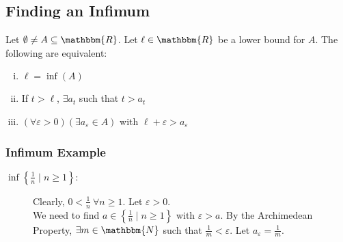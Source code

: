 \documentclass[10pt]{extarticle}
\newcommand{\N}{\mathbbm{N}}
\newcommand{\R}{\mathbbm{R}}
\begin{document}
    \subsection{Finding an Infimum}%
    Let $\emptyset \neq A \subseteq \R$. Let $\ell \in \R$ be a lower bound for $A$. The following are equivalent:
    \begin{enumerate}[(i)]
      \item $\ell = \inf(A)$
      \item If $t > \ell$, $\exists a_t$ such that $t > a_t$
      \item $(\forall \varepsilon > 0)(\exists a_{\varepsilon}\in A)$ with $\ell + \varepsilon > a_{\varepsilon}$
    \end{enumerate}
    \subsubsection{Infimum Example}%
    \begin{description}
      \item[$\inf\left\{\frac{1}{n}\mid n\geq 1\right\}:$] Clearly, $0 < \frac{1}{n}~\forall n \geq 1$. Let $\varepsilon > 0$.\\

        We need to find $a\in\left\{\frac{1}{n}\mid n\geq 1\right\}$ with $\varepsilon > a$. By the Archimedean Property, $\exists m\in\N$ such that $\frac{1}{m} < \varepsilon$. Let $a_{\varepsilon} = \frac{1}{m}$.
    \end{description}
\end{document}
